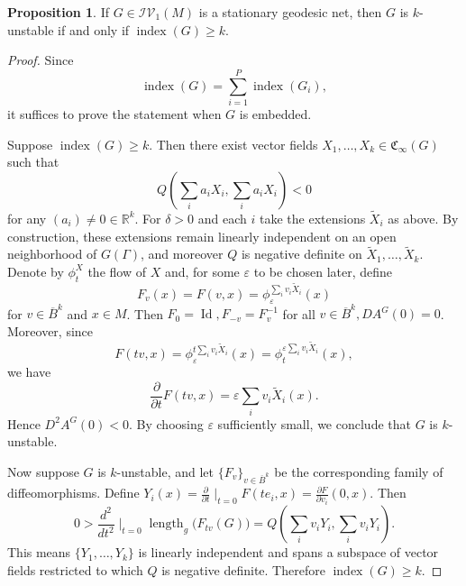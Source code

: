 \documentclass[12pt,english]{article}
\theoremstyle{definition}
\newtheorem{proposition}[theorem]{Proposition}
\begin{document}
\begin{proposition} \label{equiv_lemma}
    If $G \in \mathcal{IV}_1(M)$ is a stationary geodesic net, then $G$ is $k$-unstable if and only if $\operatorname{index}(G) \geq k$.
\end{proposition}
\begin{proof}
Since
\[
\operatorname{index}(G)=\sum_{i=1}^{P}\operatorname{index}(G_i),
\]
it suffices to prove the statement when $G$ is embedded.

Suppose $\operatorname{index}(G) \geq k$. Then there exist vector fields $X_1, \ldots, X_k \in \mathfrak{C}_{\infty}(G)$ such that
\begin{equation*}
    Q(\sum_i a_i X_i, \sum_i a_i X_i) < 0
\end{equation*}
for any $(a_i) \neq 0 \in \mathbb{R}^k$. For $\delta > 0$ and each $i$ take the extensions $\tilde{X}_i$ as above. By construction, these extensions remain linearly independent on an open neighborhood of $G(\Gamma)$, and moreover $Q$ is negative definite on $\tilde{X}_1, \ldots, \tilde{X}_k$. Denote by $\phi^X_t$ the flow of $X$ and, for some $\varepsilon$ to be chosen later, define
\begin{equation*}
    F_v(x) = F(v, x) = \phi_\varepsilon^{\sum_i v_i \tilde{X}_i} (x)
\end{equation*}
for $v \in \overline{B}^k$ and $x \in M$. Then $F_0 = \operatorname{Id}, F_{-v} = F^{-1}_v$ for all $v \in \overline{B}^k, DA^G(0) = 0$. Moreover, since
\begin{equation*}
    F(tv, x) = \phi_\varepsilon^{t \sum_i v_i \tilde{X}_i} (x) = \phi_t^{\varepsilon \sum_i v_i \tilde{X}_i} (x),
\end{equation*}
we have
\begin{equation*}
    \frac{\partial}{\partial t} F(tv, x) = \varepsilon \sum_i v_i \tilde{X}_i (x).
\end{equation*}
Hence $D^2A^G(0) < 0$. By choosing $\varepsilon$ sufficiently small, we conclude that $G$ is $k$-unstable.

Now suppose $G$ is $k$-unstable, and let $\{F_v\}_{v \in \overline{B}^k}$ be the corresponding family of diffeomorphisms. Define $Y_i(x) = \frac{\partial}{\partial t} \mid_{t = 0} F (t e_i, x) = \frac{\partial F}{\partial v_i} (0, x)$. Then
\begin{equation*}
    0 > \frac{d^2}{dt^2} \mid_{t = 0} \operatorname{length}_g\bigl(F_{tv}(G)\bigr) = Q(\sum_{i} v_i Y_i, \sum_{i} v_i Y_i).
\end{equation*}
This means $\{Y_1, \ldots, Y_k\}$ is linearly independent and spans a subspace of vector fields restricted to which $Q$ is negative definite. Therefore $\operatorname{index}(G) \geq k$.
\end{proof}
\end{document}
